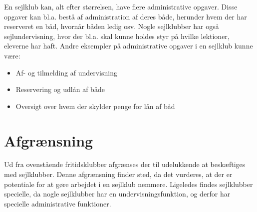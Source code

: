 En sejlklub kan, alt efter størrelsen, have flere administrative opgaver.
Disse opgaver kan bl.a. bestå af administration af deres både, herunder hvem der har reserveret en båd, hvornår båden ledig osv.
Nogle sejlklubber har også sejlundervisning, hvor der bl.a. skal kunne holdes styr på hvilke lektioner, eleverne har haft. 
Andre eksempler på administrative opgaver i en sejlklub kunne være:

\begin{itemize}
  \item Af- og tilmelding af undervisning
  \item Reservering og udlån af både 
  \item Oversigt over hvem der skylder penge for lån af båd
\end{itemize}

\section{Afgrænsning}

Ud fra ovenstående fritidsklubber afgrænses der til udelukkende at beskæftiges med sejlklubber. 
Denne afgrænsning finder sted, da det vurderes, at der er potentiale for at gøre arbejdet i en sejlklub nemmere.
Ligeledes findes sejlklubber specielle, da nogle sejlklubber har en undervisningsfunktion, og derfor har specielle administrative funktioner.
